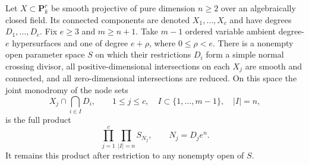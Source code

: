 \begin{lemma}\label{lem:all-X-independent-nodes}
Let $X\subset\mathbf P^r_k$ be smooth projective of pure
dimension $n\geq2$ over an algebraically closed field.
Its connected components are denoted $X_1,\ldots,X_c$ and
have degrees $D_1,\ldots,D_c$.  Fix $e\geq3$ and $m\geq n+1$.
Take $m-1$ ordered variable ambient degree-$e$ hypersurfaces
and one of degree $e+\rho$, where $0\leq\rho<e$.
There is a nonempty open parameter space $S$ on which their
restrictions $D_i$ form a simple normal crossing divisor,
all positive-dimensional intersections on each $X_j$ are
smooth and connected, and all zero-dimensional intersections
are reduced.  On this space the joint monodromy of the
node sets
\[
 X_j\cap\bigcap_{i\in I}D_i,\qquad
 1\leq j\leq c,\quad
 I\subset\{1,\ldots,m-1\},\quad |I|=n,
\]
is the full product
\[
 \prod_{j=1}^c\prod_{|I|=n} S_{N_j},
 \qquad N_j=D_j e^n.
 \tag{6}
\]
It remains this product after restriction to any nonempty
open of $S$.
\end{lemma}

